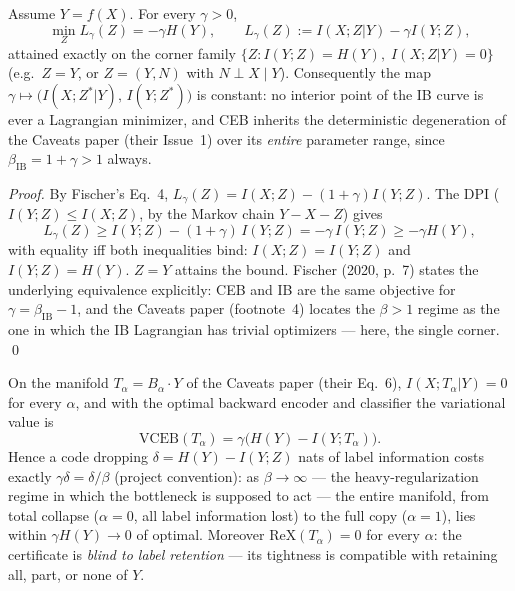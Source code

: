\begin{proposition}\label{prop:dead}
Assume $Y = f(X)$. For every $\gamma > 0$,
\begin{equation}
\min_Z L_\gamma(Z) = -\gamma H(Y),
\qquad
L_\gamma(Z) := I(X;Z|Y) - \gamma I(Y;Z),
\label{eq:min}
\end{equation}
attained exactly on the corner family
$\{Z : I(Y;Z) = H(Y),\; I(X;Z|Y) = 0\}$ (e.g.\ $Z = Y$, or $Z = (Y, N)$ with
$N \perp X \mid Y$). Consequently the map
$\gamma \mapsto \big(I(X;Z^*|Y),\, I(Y;Z^*)\big)$ is constant: no interior point of the
IB curve is ever a Lagrangian minimizer, and CEB inherits the deterministic degeneration
of the Caveats paper (their Issue~1) over its \emph{entire} parameter range, since
$\beta_{\mathrm{IB}} = 1 + \gamma > 1$ always.
\end{proposition}

\begin{proof}
By Fischer's Eq.~4, $L_\gamma(Z) = I(X;Z) - (1+\gamma)I(Y;Z)$. The DPI
($I(Y;Z) \le I(X;Z)$, by the Markov chain $Y - X - Z$) gives
\begin{equation}
L_\gamma(Z) \ge I(Y;Z) - (1+\gamma)\,I(Y;Z)
= -\gamma\,I(Y;Z) \ge -\gamma H(Y),
\label{eq:chain}
\end{equation}
with equality iff both inequalities bind: $I(X;Z) = I(Y;Z)$ and $I(Y;Z) = H(Y)$.
$Z = Y$ attains the bound. Fischer (2020, p.~7) states the underlying equivalence
explicitly: CEB and IB are the same objective for $\gamma = \beta_{\mathrm{IB}} - 1$,
and the Caveats paper (footnote~4) locates the $\beta > 1$ regime as the one in which the
IB Lagrangian has trivial optimizers --- here, the single corner. \hfill\qed
\end{proof}

\begin{proposition}\label{prop:flat}
On the manifold $T_\alpha = B_\alpha \cdot Y$ of the Caveats paper (their Eq.~6),
$I(X;T_\alpha|Y) = 0$ for every $\alpha$, and with the optimal backward encoder and
classifier the variational value is
\begin{equation}
\mathrm{VCEB}(T_\alpha) = \gamma\big(H(Y) - I(Y;T_\alpha)\big).
\label{eq:vceb}
\end{equation}
Hence a code dropping $\delta = H(Y) - I(Y;Z)$ nats of label information costs exactly
$\gamma\delta = \delta/\beta$ (project convention): as $\beta \to \infty$ --- the
heavy-regularization regime in which the bottleneck is supposed to act --- the entire
manifold, from total collapse ($\alpha = 0$, all label information lost) to the full copy
($\alpha = 1$), lies within $\gamma H(Y) \to 0$ of optimal. Moreover
$\mathrm{ReX}(T_\alpha) = 0$ for every $\alpha$: the certificate is \emph{blind to label
retention} --- its tightness is compatible with retaining all, part, or none of $Y$.
\end{proposition}


